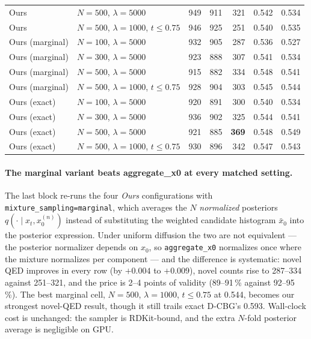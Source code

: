 \documentclass[11pt]{article}
\begin{document}
\begin{table}[h]
\begin{tabular}{llrrrrr}
Ours              & $N{=}500$, $\lambda{=}5000$      & 949 & 911 & 321 & 0.542 & 0.534 \\
Ours              & $N{=}500$, $\lambda{=}1000$, $t \le 0.75$ & 946 & 925 & 251 & 0.540 & 0.535 \\
\midrule
Ours (marginal)   & $N{=}100$, $\lambda{=}5000$      & 932 & 905 & 287 & 0.536 & 0.527 \\
Ours (marginal)   & $N{=}300$, $\lambda{=}5000$      & 923 & 888 & 307 & 0.541 & 0.534 \\
Ours (marginal)   & $N{=}500$, $\lambda{=}5000$      & 915 & 882 & 334 & 0.548 & 0.541 \\
Ours (marginal)   & $N{=}500$, $\lambda{=}1000$, $t \le 0.75$ & 928 & 904 & 303 & 0.545 & 0.544 \\
\midrule
Ours (exact)      & $N{=}100$, $\lambda{=}5000$      & 920 & 891 & 300 & 0.540 & 0.534 \\
Ours (exact)      & $N{=}300$, $\lambda{=}5000$      & 936 & 902 & 325 & 0.544 & 0.541 \\
Ours (exact)      & $N{=}500$, $\lambda{=}5000$      & 921 & 885 & \textbf{369} & 0.548 & 0.549 \\
Ours (exact)      & $N{=}500$, $\lambda{=}1000$, $t \le 0.75$ & 930 & 896 & 342 & 0.547 & 0.543 \\
\bottomrule
\end{tabular}
\end{table}

\paragraph{The marginal variant beats aggregate\_x0 at every matched setting.}
The last block re-runs the four \emph{Ours} configurations with
\texttt{mixture\_sampling=marginal}, which averages the $N$ \emph{normalized}
posteriors $q(\cdot \mid x_t, x_0^{(n)})$ instead of substituting the weighted
candidate histogram $\bar{x}_0$ into the posterior expression. Under uniform
diffusion the two are not equivalent --- the posterior normalizer depends on
$x_0$, so \texttt{aggregate\_x0} normalizes once where the mixture normalizes
per component --- and the difference is systematic: novel QED improves in
every row (by $+0.004$ to $+0.009$), novel counts rise to 287--334 against
251--321, and the price is 2--4 points of validity (89--91\,\% against
92--95\,\%). The best marginal cell, $N{=}500$, $\lambda{=}1000$,
$t \le 0.75$ at 0.544, becomes our strongest novel-QED result, though it
still trails exact D-CBG's 0.593. Wall-clock cost is unchanged: the sampler
is RDKit-bound, and the extra $N$-fold posterior average is negligible on
GPU.
\end{document}
